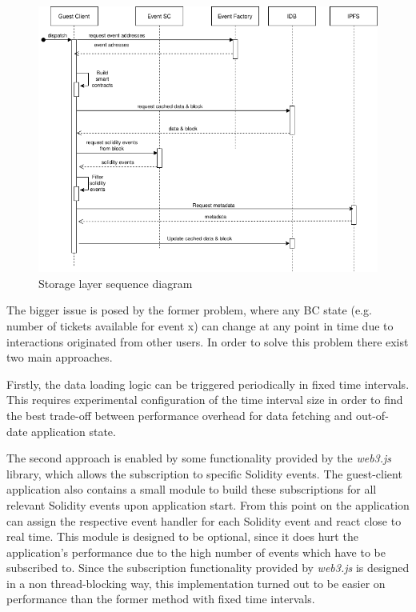\begin{figure}[hbt]
    \centering
    \includegraphics[width=14cm]{images/storage_sequence.png}
    \caption{Storage layer sequence diagram}
    \label{fig:storage_sequence}
\end{figure}

The bigger issue is posed by the former problem, where any BC state (e.g. number of tickets available for event x) can change at any point in time due to interactions originated from other users. In order to solve this problem there exist two main approaches. 

Firstly, the data loading logic can be triggered periodically in fixed time intervals. This requires experimental configuration of the time interval size in order to find the best trade-off between performance overhead for data fetching and out-of-date application state. 

The second approach is enabled by some functionality provided by the \textit{web3.js} library, which allows the subscription to specific Solidity events. The guest-client application also contains a small module to build these subscriptions for all relevant Solidity events upon application start. From this point on the application can assign the respective event handler for each Solidity event and react close to real time. This module is designed to be optional, since it does hurt the application's performance due to the high number of events which have to be subscribed to. Since the subscription functionality provided by \textit{web3.js} is designed in a non thread-blocking way, this implementation turned out to be easier on performance than the former method with fixed time intervals.
